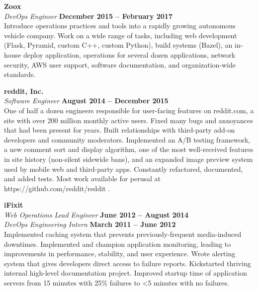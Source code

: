 \documentclass[margin,line]{resume}
\begin{document}
\begin{resume}
    \textbf{\listing Zoox} \vspace{2mm}\\\vspace{1mm}%
    \textsl{DevOps Engineer} \hfill \textbf{December 2015 -- February 2017}\\
    Introduce operations practices and tools into a rapidly growing autonomous vehicle company.
    Work on a wide range of tasks, including web development (Flask, Pyramid, custom C++, custom Python), build systems (Bazel), an in-house deploy application, operations for several dozen applications, network security, AWS user support, software documentation, and organization-wide standards.

    \textbf{\listing reddit, Inc.} \vspace{2mm}\\\vspace{1mm}%
    \textsl{Software Engineer} \hfill \textbf{August 2014 -- December 2015}\\
    One of half a dozen engineers responsible for user-facing features on reddit.com, a site with over 200 million monthly active users.
    Fixed many bugs and annoyances that had been present for years.
    Built relationships with third-party add-on developers and community moderators.
    Implemented an A/B testing framework, a new comment sort and display algorithm, one of the most well-received features in site history (non-silent sidewide bans), and an expanded image preview system used by mobile web and third-party apps.
    Constantly refactored, documented, and added tests.
    Most work available for perusal at https://github.com/reddit/reddit .

    \textbf{\listing iFixit} \vspace{2mm}\\\vspace{1mm}%
    \textsl{Web Operations Lead Engineer} \hfill \textbf{June 2012 -- August 2014}\\
    \textsl{DevOps Engineering Intern} \hfill \textbf{March 2011 -- June 2012}\\
    Implemented caching system that prevents previously-frequent media-induced downtimes.
    Implemented and champion application monitoring, leading to improvements in performance, stability, and user experience.
    Wrote alerting system that gives developers direct access to failure reports.
    Kickstarted thriving internal high-level documentation project.
    Improved startup time of application servers from 15 minutes with 25\% failures to \textless5 minutes with no failures.


\end{resume}
\end{document}
